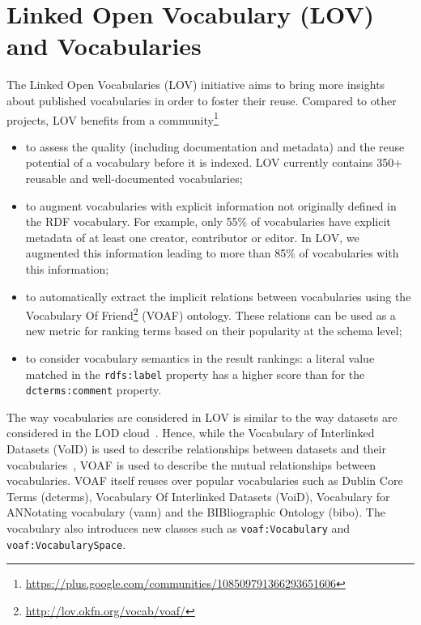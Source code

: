 \section{Linked Open Vocabulary (LOV) and Vocabularies}        \label{sec:lov-approach}
The Linked Open Vocabularies (LOV) initiative aims to bring more insights about published vocabularies in order to foster their reuse. Compared to other projects, LOV benefits from a community\footnote{\url{https://plus.google.com/communities/108509791366293651606}}
\begin{itemize}
 \item to assess the quality (including documentation and metadata) and the reuse potential of a vocabulary before it is indexed. LOV  currently contains 350+ reusable and well-documented vocabularies;
 \item to augment vocabularies with explicit information not originally defined in the RDF vocabulary. For example, only 55\% of vocabularies have explicit metadata of at least one creator, contributor or editor. In LOV, we augmented this information leading to more than 85\% of vocabularies with this information;
 \item to automatically extract the implicit relations between vocabularies using the Vocabulary Of Friend\footnote{\url{http://lov.okfn.org/vocab/voaf/}} (VOAF) ontology. These relations can be used as a new metric for ranking terms based on their popularity at the schema level;
 \item to consider vocabulary semantics in the result rankings: a literal value matched in the \texttt{rdfs:label} property has a higher score than for the \texttt{dcterms:comment} property.
\end{itemize}

The way vocabularies are considered in LOV is similar to the way datasets are considered in the LOD cloud~\cite{Bizer2009}. Hence, while the Vocabulary of Interlinked Datasets (VoID) is used to describe relationships between datasets and their vocabularies~\cite{alexander2009}, VOAF is used to describe the mutual relationships between vocabularies. VOAF itself reuses over popular vocabularies such as Dublin Core Terms (dcterms), Vocabulary Of Interlinked Datasets (VoiD), Vocabulary for ANNotating vocabulary (vann) and the BIBliographic Ontology (bibo). The vocabulary also introduces new classes such as \texttt{voaf:Vocabulary} and \texttt{voaf:VocabularySpace}.


